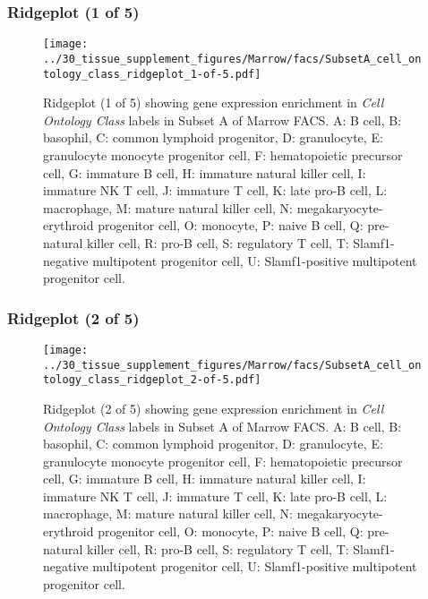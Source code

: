 \clearpage

\subsubsection{Ridgeplot (1 of 5)}
\begin{figure}[h]
\centering
\texttt{[image: ../30\_tissue\_supplement\_figures/Marrow/facs/SubsetA\_cell\_ontology\_class\_ridgeplot\_1-of-5.pdf]}

\caption{ Ridgeplot (1 of 5)  showing gene expression enrichment in \emph{Cell Ontology Class} labels in Subset A of Marrow FACS. A: B cell, B: basophil, C: common lymphoid progenitor, D: granulocyte, E: granulocyte monocyte progenitor cell, F: hematopoietic precursor cell, G: immature B cell, H: immature natural killer cell, I: immature NK T cell, J: immature T cell, K: late pro-B cell, L: macrophage, M: mature natural killer cell, N: megakaryocyte-erythroid progenitor cell, O: monocyte, P: naive B cell, Q: pre-natural killer cell, R: pro-B cell, S: regulatory T cell, T: Slamf1-negative multipotent progenitor cell, U: Slamf1-positive multipotent progenitor cell.}
\end{figure}


\clearpage

\subsubsection{Ridgeplot (2 of 5)}
\begin{figure}[h]
\centering
\texttt{[image: ../30\_tissue\_supplement\_figures/Marrow/facs/SubsetA\_cell\_ontology\_class\_ridgeplot\_2-of-5.pdf]}

\caption{ Ridgeplot (2 of 5)  showing gene expression enrichment in \emph{Cell Ontology Class} labels in Subset A of Marrow FACS. A: B cell, B: basophil, C: common lymphoid progenitor, D: granulocyte, E: granulocyte monocyte progenitor cell, F: hematopoietic precursor cell, G: immature B cell, H: immature natural killer cell, I: immature NK T cell, J: immature T cell, K: late pro-B cell, L: macrophage, M: mature natural killer cell, N: megakaryocyte-erythroid progenitor cell, O: monocyte, P: naive B cell, Q: pre-natural killer cell, R: pro-B cell, S: regulatory T cell, T: Slamf1-negative multipotent progenitor cell, U: Slamf1-positive multipotent progenitor cell.}
\end{figure}


\clearpage

